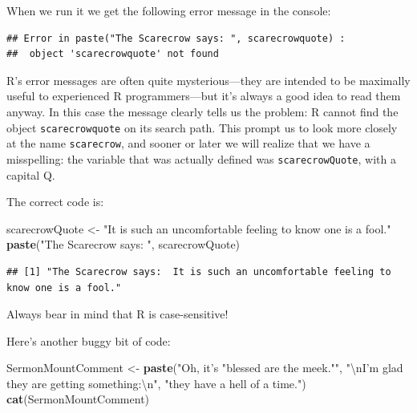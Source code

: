 \documentclass[]{book}
\makeatletter
\newenvironment{Shaded}{\begin{snugshade}}{\end{snugshade}}
\newcommand{\KeywordTok}[1]{\textcolor[rgb]{0.13,0.29,0.53}{\textbf{{#1}}}}
\newcommand{\CharTok}[1]{\textcolor[rgb]{0.31,0.60,0.02}{{#1}}}
\newcommand{\StringTok}[1]{\textcolor[rgb]{0.31,0.60,0.02}{{#1}}}
\newcommand{\NormalTok}[1]{{#1}}
\newenvironment{kframe}{%
\medskip{}
\setlength{\fboxsep}{.8em}
 \def\at@end@of@kframe{}%
 \ifinner\ifhmode%
  \def\at@end@of@kframe{\end{minipage}}%
  \begin{minipage}{\columnwidth}%
 \fi\fi%
 \def\FrameCommand##1{\hskip\@totalleftmargin \hskip-\fboxsep
 \colorbox{shadecolor}{##1}\hskip-\fboxsep
     \hskip-\linewidth \hskip-\@totalleftmargin \hskip\columnwidth}%
 \MakeFramed {\advance\hsize-\width
   \@totalleftmargin\z@ \linewidth\hsize
   \@setminipage}}%
 {\par\unskip\endMakeFramed%
 \at@end@of@kframe}
\renewenvironment{Shaded}{\begin{kframe}}{\end{kframe}}
\theoremstyle{definition}
\theoremstyle{definition}
\theoremstyle{remark}
\let\BeginKnitrBlock\begin \let\EndKnitrBlock\end
\makeatother
\begin{document}
When we run it we get the following error message in the console:

\begin{verbatim}
## Error in paste("The Scarecrow says: ", scarecrowquote) : 
##  object 'scarecrowquote' not found
\end{verbatim}

R's error messages are often quite mysterious---they are intended to be
maximally useful to experienced R programmers---but it's always a good
idea to read them anyway. In this case the message clearly tells us the
problem: R cannot find the object \texttt{scarecrowquote} on its search
path. This prompt us to look more closely at the name
\texttt{scarecrow}, and sooner or later we will realize that we have a
misspelling: the variable that was actually defined was
\texttt{scarecrowQuote}, with a capital Q.

The correct code is:

\begin{Shaded}
\begin{Highlighting}[]
\NormalTok{scarecrowQuote <-}\StringTok{ "It is such an uncomfortable feeling to know one is a fool."}
\KeywordTok{paste}\NormalTok{(}\StringTok{"The Scarecrow says: "}\NormalTok{, scarecrowQuote)}
\end{Highlighting}
\end{Shaded}

\begin{verbatim}
## [1] "The Scarecrow says:  It is such an uncomfortable feeling to know one is a fool."
\end{verbatim}

\BeginKnitrBlock{rmdimportant}
Always bear in mind that R is case-sensitive!
\EndKnitrBlock{rmdimportant}

Here's another buggy bit of code:

\begin{Shaded}
\begin{Highlighting}[]
\NormalTok{SermonMountComment <-}\StringTok{ }\KeywordTok{paste}\NormalTok{(}\StringTok{"Oh, it's "}\NormalTok{blessed are the meek.}\StringTok{""}\NormalTok{,}
                     \StringTok{"}\CharTok{\textbackslash{}n}\StringTok{I'm glad they are getting something:}\CharTok{\textbackslash{}n}\StringTok{"}\NormalTok{,}
                     \StringTok{"they have a hell of a time."}\NormalTok{)}
\KeywordTok{cat}\NormalTok{(SermonMountComment)}
\end{Highlighting}
\end{Shaded}
\end{document}
